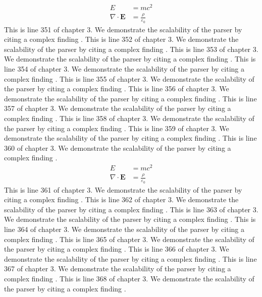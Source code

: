 \begin{align*}
  E &= mc^2 \\
  \nabla \cdot \mathbf{E} &= \frac{\rho}{\varepsilon_0}
\end{align*}
This is line 351 of chapter 3. We demonstrate the scalability of the parser by citing a complex finding \cite{ref3_351}.
This is line 352 of chapter 3. We demonstrate the scalability of the parser by citing a complex finding \cite{ref3_352}.
This is line 353 of chapter 3. We demonstrate the scalability of the parser by citing a complex finding \cite{ref3_353}.
This is line 354 of chapter 3. We demonstrate the scalability of the parser by citing a complex finding \cite{ref3_354}.
This is line 355 of chapter 3. We demonstrate the scalability of the parser by citing a complex finding \cite{ref3_355}.
This is line 356 of chapter 3. We demonstrate the scalability of the parser by citing a complex finding \cite{ref3_356}.
This is line 357 of chapter 3. We demonstrate the scalability of the parser by citing a complex finding \cite{ref3_357}.
This is line 358 of chapter 3. We demonstrate the scalability of the parser by citing a complex finding \cite{ref3_358}.
This is line 359 of chapter 3. We demonstrate the scalability of the parser by citing a complex finding \cite{ref3_359}.
This is line 360 of chapter 3. We demonstrate the scalability of the parser by citing a complex finding \cite{ref3_360}.
\begin{align*}
  E &= mc^2 \\
  \nabla \cdot \mathbf{E} &= \frac{\rho}{\varepsilon_0}
\end{align*}
This is line 361 of chapter 3. We demonstrate the scalability of the parser by citing a complex finding \cite{ref3_361}.
This is line 362 of chapter 3. We demonstrate the scalability of the parser by citing a complex finding \cite{ref3_362}.
This is line 363 of chapter 3. We demonstrate the scalability of the parser by citing a complex finding \cite{ref3_363}.
This is line 364 of chapter 3. We demonstrate the scalability of the parser by citing a complex finding \cite{ref3_364}.
This is line 365 of chapter 3. We demonstrate the scalability of the parser by citing a complex finding \cite{ref3_365}.
This is line 366 of chapter 3. We demonstrate the scalability of the parser by citing a complex finding \cite{ref3_366}.
This is line 367 of chapter 3. We demonstrate the scalability of the parser by citing a complex finding \cite{ref3_367}.
This is line 368 of chapter 3. We demonstrate the scalability of the parser by citing a complex finding \cite{ref3_368}.

